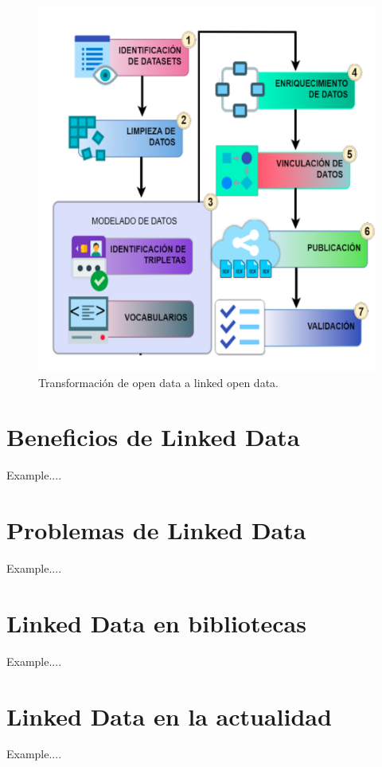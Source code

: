 \documentclass[11pt]{report}
\begin{document}
		\begin{figure}[H]
			\centering
			\includegraphics[scale=0.09]{../img/od-lod1.png} %
			\caption{Transformación de open data a linked open data.}
			\label{fig:od->lod}
		\end{figure}
\chapter{Beneficios de Linked Data}
Example....

\chapter{Problemas de Linked Data}
Example....

\chapter{Linked Data en bibliotecas}
Example....

\chapter{Linked Data en la actualidad}
Example....
\end{document}
